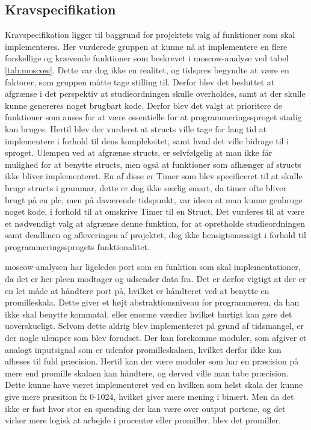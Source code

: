\subsection*{Kravspecifikation}
Kravspecifikation ligger til baggrund for projektets valg af funktioner som skal implementeres.
Her vurderede gruppen at kunne nå at implementere en flere forskellige og krævende funktioner som beskrevet i \gls{moscow}-analyse ved tabel \ref{tab:moscow}.
Dette var dog ikke en realitet, og tidspres begyndte at være en faktorer, som gruppen måtte tage stilling til.
Derfor blev det besluttet at afgrænse i det perspektiv at studieordningen skulle overholdes, samt at der skulle kunne genereres noget brugbart kode.
Derfor blev det valgt at prioritere de funktioner som anses for at være essentielle for at programmeringssproget stadig kan bruges. Hertil blev der vurderet at structs ville tage for lang tid at implementere i forhold til dens kompleksitet, samt hvad det ville bidrage til i sproget.
Ulempen ved at afgrænse structs, er selvfølgelig at man ikke får mulighed for at benytte structs, men også at funktioner som afhænger af structs ikke bliver implementeret.
En af disse er Timer som blev specificeret til at skulle bruge structs i grammar, dette er dog ikke særlig smart, da timer ofte bliver brugt på en \gls{plc}, men på daværende tidspunkt, var ideen at man kunne genbruge noget kode, i forhold til at omskrive Timer til en Struct.
Det vurderes til at være et nødvendigt valg at afgrænse denne funktion, for at opretholde studieordningen samt deadlinen og afleveringen af projektet, dog ikke hensigtsmæssigt i forhold til programmeringssprogets funktionalitet.

\gls{moscow}-analysen har ligeledes port som en funktion som skal implementationer, da det er her \gls{plc}en modtager og udsender data fra.
Det er derfor vigtigt at der er en let måde at håndtere port på, hvilket er håndteret ved at benytte en promilleskala.
Dette giver et højt abstraktionsniveau for programmøren, da han ikke skal benytte kommatal, eller enorme værdier hvilket hurtigt kan gøre det uoverskueligt.
Selvom dette aldrig blev implementeret på grund af tidsmangel, er der nogle ulemper som blev forudset.
Der kan forekomme moduler, som afgiver et analogt inputsignal som er udenfor promilleskalaen, hvilket derfor ikke kan aflæses til fuld præcision. 
Hertil kan der være moduler som har en præcision på mere end promille skalaen kan håndtere, og derved ville man tabe præcision.
Dette kunne have været implementeret ved en hvilken som helst skala der kunne give mere præsition fx 0-1024, hvilket giver mere mening i binært. Men da det ikke er fast hvor stor en spænding der kan være over output portene, og det virker mere logisk at arbejde i procenter eller promiller, blev det promiller. 

